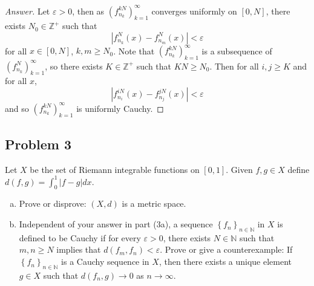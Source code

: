 \documentclass[12pt]{article}
\newcommand{\n}{\mathbb{N}}
\newcommand{\z}{\mathbb{Z}}
\newcommand\paren[1]{\left( #1 \right)}
\newcommand\setb[1]{\left \{ #1 \right \}}
\newcommand{\abs}[1]{\left | #1 \right |}
\newcommand{\eps}{\varepsilon}
\theoremstyle{definition}
\begin{document}
\begin{proof}[Answer]
    Let $\eps > 0$, then as $\paren{ f_{n_k}^{kN} }_{k = 1}^{\infty}$ converges uniformly on $[0,N]$, there exists $N_0 \in \z^+$ such that 
    \[
        \abs{ f^N_{n_k}(x) - f^{N}_{n_m}(x) } < \eps 
    \]
    for all $x \in [0,N]$, $k , m \geq N_0$. Note that $\paren{ f^{kN}_{n_k} }_{k = 1}^{\infty}$ is a subsequence of $\paren{ f^{N}_{n_k} }_{k = 1}^{\infty}$, so there exists $K \in \z^+$ such that $KN \geq N_0$. Then for all $i , j \geq K$ and for all $x$, 
    \[
        \abs{ f_{n_i}^{iN}(x) - f^{jN}_{n_j}(x) } < \eps 
    \]
    and so $\paren{ f_{n_k}^{kN} }_{k = 1}^{\infty}$ is uniformly Cauchy. 
\end{proof}
\subsection{Problem 3}
Let $X$ be the set of Riemann integrable functions on $[0,1]$. Given $f, g \in X$ define $d(f,g) = \int_0^1 \abs{f-g}dx$.
\begin{enumerate}[(a)]
    \item Prove or disprove: $(X,d)$ is a metric space.
    \item Independent of your answer in part (3a), a sequence $\setb{ f_n }_{n \in \n}$ in $X$ is defined to be Cauchy if for every $\eps > 0$, there exists $N \in \n$ such that $m , n \geq N$ implies that $d \paren{ f_m , f_n } < \eps$. Prove or give a counterexample: If $\setb{ f_n }_{n \in \n}$ is a Cauchy sequence in $X$, then there exists a unique element $g \in X$ such that $d \paren{ f_n , g } \to 0$ as $n \to \infty$.
\end{enumerate}
\end{document}
